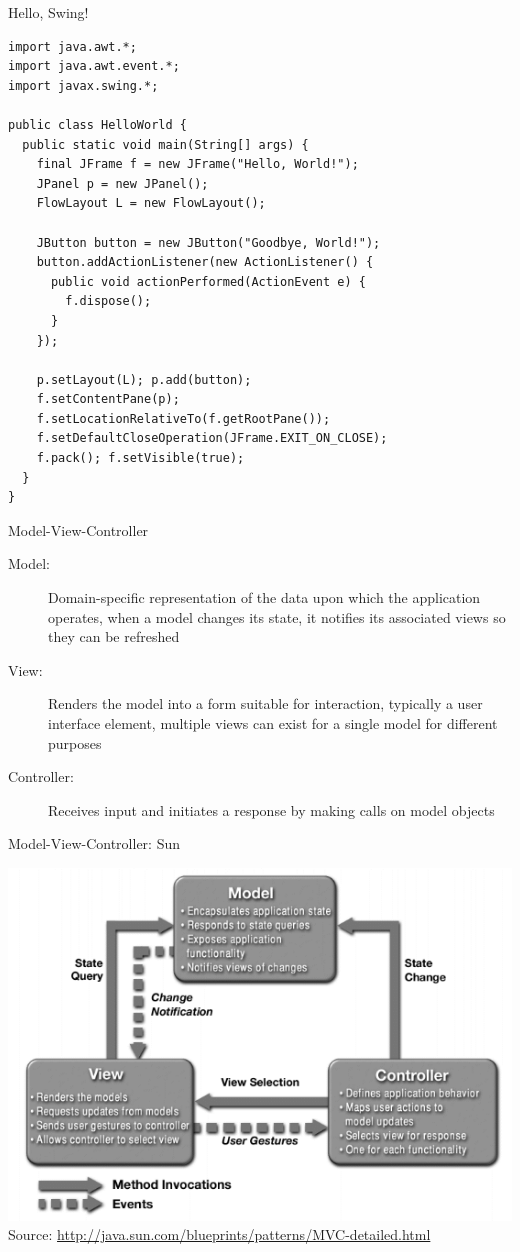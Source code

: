 \begin{frame}[fragile]{Hello, Swing!}
\begin{lstlisting}[basicstyle=\fontsize{7}{9}\selectfont\ttfamily]
import java.awt.*;
import java.awt.event.*;
import javax.swing.*;

public class HelloWorld {
  public static void main(String[] args) {
    final JFrame f = new JFrame("Hello, World!");
    JPanel p = new JPanel();
    FlowLayout L = new FlowLayout();

    JButton button = new JButton("Goodbye, World!");
    button.addActionListener(new ActionListener() {
      public void actionPerformed(ActionEvent e) {
        f.dispose();
      }
    });

    p.setLayout(L); p.add(button);
    f.setContentPane(p);
    f.setLocationRelativeTo(f.getRootPane());
    f.setDefaultCloseOperation(JFrame.EXIT_ON_CLOSE);
    f.pack(); f.setVisible(true);
  }
}
\end{lstlisting}
\end{frame}

\begin{frame}{Model-View-Controller}
  \begin{description}
  \item[Model:] Domain-specific representation of the data upon which
    the application operates, when a model changes its state, it
    notifies its associated views so they can be refreshed
  \item[View:] Renders the model into a form suitable for interaction,
    typically a user interface element, multiple views can exist for a
    single model for different purposes
  \item[Controller:] Receives input and initiates a response by making
    calls on model objects
  \end{description}
\end{frame}

\begin{frame}{Model-View-Controller: Sun}
  \begin{center}
    \includegraphics[scale=0.4]{figures/mvc} \\
    \tiny{Source: \url{http://java.sun.com/blueprints/patterns/MVC-detailed.html}}
  \end{center}
\end{frame}

